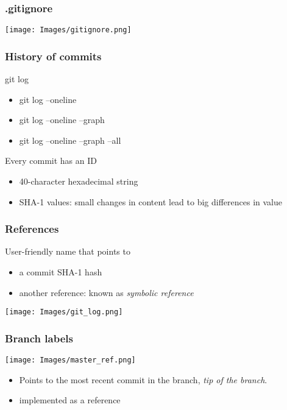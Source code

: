 \documentclass{beamer}
\begin{document}
	\begin{frame}[plain]
		\frametitle{.gitignore}
		
		\begin{center}
			\texttt{[image: Images/gitignore.png]}
		\end{center}
		
	
	\end{frame}

	\begin{frame}[plain]
		\frametitle{History of commits}
			 \begin{center}
				git log 
				\begin{itemize}
					\item git log --oneline
					\item git log --oneline --graph
					\item git log --oneline --graph --all
				\end{itemize}

			 \end{center}

			 Every commit has an ID 
			 \begin{itemize}
				 \item 40-character hexadecimal string
				 \item SHA-1 values: small changes in content lead to big differences in value
			 \end{itemize}

	\end{frame}

	\begin{frame}[plain]
		\frametitle{References}
		User-friendly name that points to 
		\begin{itemize}
			\item a commit SHA-1 hash
			\item another reference: known as \textit{symbolic reference}
		 \end{itemize}
		\begin{center}
			\texttt{[image: Images/git\_log.png]}
		\end{center}
				 
	\end{frame}

	\begin{frame}[plain]
		\frametitle{Branch labels}
		\begin{center}
			\texttt{[image: Images/master\_ref.png]}
		\end{center}
		\begin{itemize}
			\item Points to the most recent commit in the branch, \textit{tip of the branch}.
			\item implemented as a reference
		\end{itemize}
	\end{frame}
\end{document}
